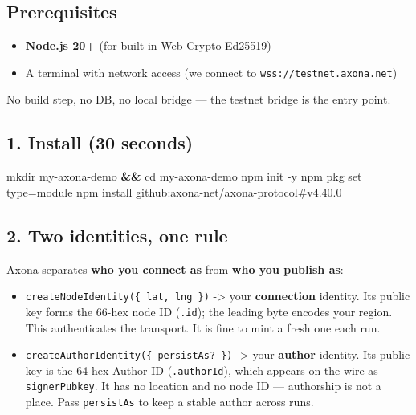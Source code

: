 \documentclass[
  nobib]{tufte-handout}
\newenvironment{Shaded}{}{}
\newcommand{\AttributeTok}[1]{\textcolor[rgb]{0.49,0.56,0.16}{#1}}
\newcommand{\BuiltInTok}[1]{\textcolor[rgb]{0.00,0.50,0.00}{#1}}
\newcommand{\ExtensionTok}[1]{#1}
\newcommand{\FunctionTok}[1]{\textcolor[rgb]{0.02,0.16,0.49}{#1}}
\newcommand{\KeywordTok}[1]{\textcolor[rgb]{0.00,0.44,0.13}{\textbf{#1}}}
\newcommand{\NormalTok}[1]{#1}
\providecommand{\tightlist}{%
  \setlength{\itemsep}{0pt}\setlength{\parskip}{0pt}}
\begin{document}
\subsection{Prerequisites}\label{prerequisites}

\begin{itemize}
\tightlist
\item
  \textbf{Node.js 20+} (for built-in Web Crypto Ed25519)
\item
  A terminal with network access (we connect to
  \texttt{wss://testnet.axona.net})
\end{itemize}

No build step, no DB, no local bridge --- the testnet bridge is the
entry point.

\subsection{1. Install (30 seconds)}\label{install-30-seconds}

\begin{Shaded}
\begin{Highlighting}[]
\FunctionTok{mkdir}\NormalTok{ my{-}axona{-}demo }\KeywordTok{\&\&} \BuiltInTok{cd}\NormalTok{ my{-}axona{-}demo}
\ExtensionTok{npm}\NormalTok{ init }\AttributeTok{{-}y}
\ExtensionTok{npm}\NormalTok{ pkg set type=module}
\ExtensionTok{npm}\NormalTok{ install github:axona{-}net/axona{-}protocol\#v4.40.0}
\end{Highlighting}
\end{Shaded}

\subsection{2. Two identities, one rule}\label{two-identities-one-rule}

Axona separates \textbf{who you connect as} from \textbf{who you publish
as}:

\begin{itemize}
\tightlist
\item
  \texttt{createNodeIdentity(\{\ lat,\ lng\ \})} -\textgreater{} your
  \textbf{connection} identity. Its public key forms the 66-hex node ID
  (\texttt{.id}); the leading byte encodes your region. This
  authenticates the transport. It is fine to mint a fresh one each run.
\item
  \texttt{createAuthorIdentity(\{\ persistAs?\ \})} -\textgreater{} your
  \textbf{author} identity. Its public key is the 64-hex Author ID
  (\texttt{.authorId}), which appears on the wire as
  \texttt{signerPubkey}. It has no location and no node ID ---
  authorship is not a place. Pass \texttt{persistAs} to keep a stable
  author across runs.
\end{itemize}
\end{document}
